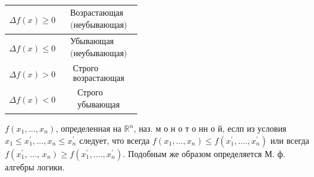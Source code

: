 \documentclass[10pt]{article}
\begin{document}
\begin{center}

\begin{tabular}{|l|c|}

\hline

$\Delta f(x) \geqslant 0$ & $\begin{array}{c}\text { Возрастающая } \\ \text { (неубывающая) }\end{array}$ \\

\hline

$\Delta f(x) \leqslant 0$ & $\begin{array}{c}\text { Убывающая } \\ \text { (неубывающая) }\end{array}$ \\

\hline

$\Delta f(x)>0$ & $\begin{array}{c}\text { Строго } \\ \text { возрастающая }\end{array}$ \\

\hline

$\Delta f(x)<0$ & $\begin{array}{c}\text { Строго } \\ \text { убывающая }\end{array}$ \\

\hline

\end{tabular}

\end{center}



$f\left(x_{1}, \ldots, x_{n}\right)$, определенная на $\mathbb{R}^{n}$, наз. м о н о т о нн о й, еслп из условия $x_{1} \leqslant x_{1}^{\prime}, \ldots, x_{n} \leqslant x_{n}^{\prime}$ следует, что всегда $f\left(x_{1}, \ldots, x_{n}\right) \leqslant f\left(x_{1}^{\prime}, \ldots ., x_{n}^{\prime}\right)$ или всегда $f\left(x_{1}^{\prime}\right.$, ..., $\left.x_{n}\right) \geqslant f\left(x_{1}^{\prime}, \ldots ., x_{n}^{\prime}\right)$. Подобным же образом определяется М. ф. алгебры логики.
\end{document}
